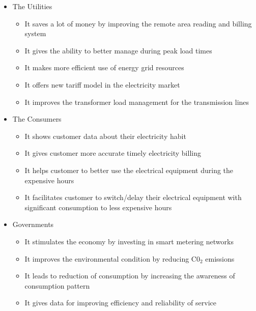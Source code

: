 \begin{itemize}
\item The Utilities
    \begin{itemize}
    \item It saves a lot of money by improving the remote area reading and billing system
    \item It gives the ability to better manage during peak load times
    \item It makes more efficient use of energy grid resources
    \item It offers new tariff model in the electricity market
    \item It improves the transformer load management for the transmission lines
    \end{itemize}
\item The Consumers
    \begin{itemize}
    \item It shows customer data about their electricity habit
    \item It gives customer more accurate timely electricity billing
    \item It helps customer to better use the electrical equipment during the expensive hours
    \item It facilitates customer to switch/delay their electrical equipment with significant consumption to less expensive hours
    \end{itemize}
\item Governments
    \begin{itemize}
    \item It stimulates the economy by investing in smart metering networks
    \item It improves the environmental condition by reducing C0$_2$ emissions
    \item It leads to reduction of consumption by increasing the awareness of consumption pattern
    \item It gives data for improving efficiency and reliability of service
    \end{itemize}
\end{itemize}

